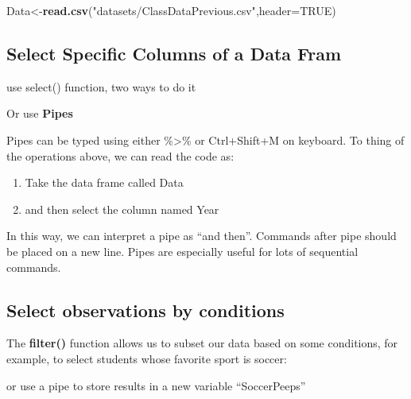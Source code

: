\documentclass[
  openany]{book}
\newenvironment{Shaded}{\begin{snugshade}}{\end{snugshade}}
\newcommand{\AttributeTok}[1]{\textcolor[rgb]{0.13,0.29,0.53}{#1}}
\newcommand{\ConstantTok}[1]{\textcolor[rgb]{0.56,0.35,0.01}{#1}}
\newcommand{\FunctionTok}[1]{\textcolor[rgb]{0.13,0.29,0.53}{\textbf{#1}}}
\newcommand{\NormalTok}[1]{#1}
\newcommand{\OtherTok}[1]{\textcolor[rgb]{0.56,0.35,0.01}{#1}}
\newcommand{\StringTok}[1]{\textcolor[rgb]{0.31,0.60,0.02}{#1}}
\providecommand{\tightlist}{%
  \setlength{\itemsep}{0pt}\setlength{\parskip}{0pt}}
\begin{document}
\begin{Shaded}
\begin{Highlighting}[]
\NormalTok{Data}\OtherTok{\textless{}{-}}\FunctionTok{read.csv}\NormalTok{(}\StringTok{"datasets/ClassDataPrevious.csv"}\NormalTok{,}\AttributeTok{header=}\ConstantTok{TRUE}\NormalTok{)}
\end{Highlighting}
\end{Shaded}

\subsection{Select Specific Columns of a Data Fram}\label{select-specific-columns-of-a-data-fram}

use select() function, two ways to do it

Or use \textbf{Pipes}

Pipes can be typed using either \%\textgreater\% or Ctrl+Shift+M on keyboard. To thing of the operations above, we can read the code as:

\begin{enumerate}
\def\labelenumi{\arabic{enumi}.}
\tightlist
\item
  Take the data frame called Data
\item
  and then select the column named Year
\end{enumerate}

In this way, we can interpret a pipe as ``and then''. Commands after pipe should be placed on a new line. Pipes are especially useful for lots of sequential commands.

\subsection{Select observations by conditions}\label{select-observations-by-conditions}

The \textbf{filter()} function allows us to subset our data based on some conditions, for example, to select students whose favorite sport is soccer:

or use a pipe to store results in a new variable ``SoccerPeeps''
\end{document}
